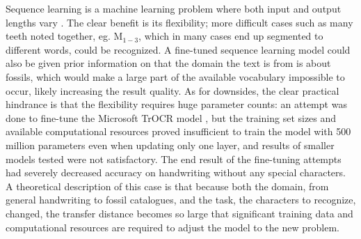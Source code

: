 \documentclass{article}
\begin{document}
Sequence learning is a machine learning problem where both input and output lengths vary \cite{sutskever2014sequence}.
The clear benefit is its flexibility; more difficult cases such as many teeth noted together, eg. $\text{M}_{1-3}$,
which in many cases end up segmented to different words, could be recognized. A fine-tuned sequence learning 
model could also be given prior information on that the domain the text is from is 
about fossils, which would make a large part of the available vocabulary impossible to occur, 
likely increasing the result quality. As for downsides, the clear practical hindrance is 
that the flexibility requires huge parameter counts: an attempt was done to fine-tune the 
Microsoft TrOCR model \cite{li2021trocr}, but the training set sizes and available computational 
resources proved insufficient to train the model with 500 million parameters even when updating only one layer,
and results of smaller models tested were not satisfactory. The end result of the fine-tuning 
attempts had severely decreased 
accuracy on handwriting without any special characters. A theoretical description of this 
case is that because both the domain, from general handwriting to fossil catalogues, 
and the task, the characters to recognize, changed, the transfer distance becomes so large 
that significant training data and computational resources are required to adjust the model 
to the new problem.

\end{document}

